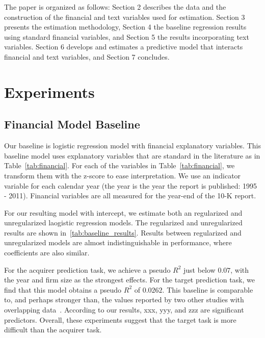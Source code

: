 \documentclass[11pt]{article}
\begin{document}
The paper is organized as follows: Section 2 describes the data and the
construction of the financial and text variables used for estimation. Section 3 presents the estimation methodology,
Section 4 the baseline regression results using standard financial variables, and Section 5
the results incorporating text variables. Section 6 develops and estimates a predictive model
that interacts financial and text variables, and Section 7 concludes.

\section{Experiments}

\subsection{Financial Model Baseline}

Our baseline is logistic regression model with financial explanatory variables. This baseline model uses explanatory
variables that are standard in the literature as in Table~\ref{tab:financial}. For each of
the variables in Table~\ref{tab:financial}, we transform them with the
z-score to ease interpretation. We use an indicator variable for each calendar
year (the year is the year the report is published: 1995 - 2011). Financial variables are all
measured for the year-end of the 10-K report.

For our resulting model with intercept, we estimate both an regularized and unregularized laogistic regression models. The
regularized and unregularized results are shown in~\ref{tab:baseline_results}. Results
between regularized and unregularized models are almost indistinguishable in performance, where coefficients
are also similar.

For the acquirer prediction task, we achieve a pseudo $R^{2}$ just below $0.07$, with the year
and firm size as the strongest effects. For the target prediction task, we find that this
model obtains a pseudo $R^{2}$ of $0.0262$. This baseline is comparable to, and perhaps stronger than,
the values reported by two other studies with overlapping data~\cite{cremers2008, edmans2012}. According to our results, xxx, yyy, and zzz are
significant predictors. Overall, these experiments suggest that the target task is more difficult than the acquirer task.
\end{document}
